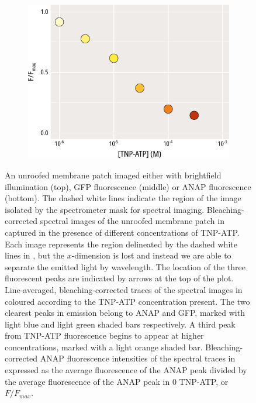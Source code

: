 \begin{figure}[hbtp]
\begin{subfigure}[t]{0.45\textwidth}
	\end{subfigure}
	\hfill
	\begin{subfigure}[t]{0.45\textwidth}
		\caption{}\label{ch3fig:unroofed_intensities}
		\centering
		\includegraphics[width=\textwidth]{unroofed_intensities.pdf}
	\end{subfigure}
	\caption[Unroofed membranes spectral images]{
	 An unroofed membrane patch imaged either with brightfield illumination (top), GFP fluorescence (middle) or ANAP fluorescence (bottom).
	The dashed white lines indicate the region of the image isolated by the spectrometer mask for spectral imaging.
	 Bleaching-corrected spectral images of the unroofed membrane patch in  captured in the presence of different concentrations of TNP-ATP.
	Each image represents the region delineated by the dashed white lines in , but the $x$-dimension is lost and instead we are able to separate the emitted light by wavelength.
	The location of the three fluorescent peaks are indicated by arrows at the top of the plot.
	 Line-averaged, bleaching-corrected traces of the spectral images in  coloured according to the TNP-ATP concentration present.
	The two clearest peaks in emission belong to ANAP and GFP, marked with light blue and light green shaded bars respectively.
	A third peak from TNP-ATP fluorescence begins to appear at higher concentrations, marked with a light orange shaded bar.
	 Bleaching-corrected ANAP fluorescence intensities of the spectral traces in  expressed as the average fluorescence of the ANAP peak divided by the average fluorescence of the ANAP peak in $0$ TNP-ATP, or $F/F_{max}$.
	}
\end{figure}

